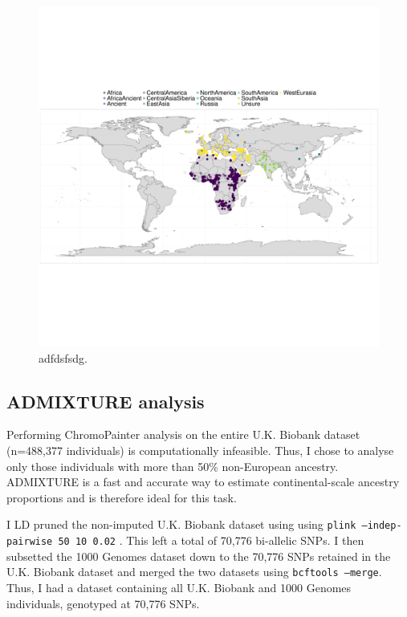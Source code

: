 \begin{figure}
    \centering
    \includegraphics[width=1.0\textwidth]{../images/chapter3/HumanOriginsMap.pdf}
    \caption{adfdsfsdg.}
    \label{fig:HumanOriginsMap}
\end{figure}


\subsection{ADMIXTURE analysis}

Performing ChromoPainter analysis on the entire U.K. Biobank dataset (n=488,377 individuals) is computationally infeasible. Thus, I chose to analyse only those individuals with more than 50\% non-European ancestry. ADMIXTURE is a fast and accurate way to estimate continental-scale ancestry proportions \cite{alexander2009fast} and is therefore ideal for this task. 

I LD pruned the non-imputed U.K. Biobank dataset using using \texttt{plink --indep-pairwise 50 10 0.02} \cite{purcell2007plink}. This left a total of  70,776 bi-allelic SNPs. I then subsetted the 1000 Genomes dataset down to the 70,776 SNPs retained in the U.K. Biobank dataset and merged the two datasets using \texttt{bcftools --merge}. Thus, I had a dataset containing all U.K. Biobank and 1000 Genomes individuals, genotyped at 70,776 SNPs.


